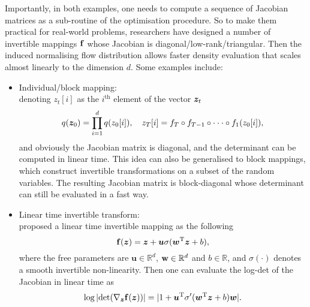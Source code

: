 Importantly, in both examples, one needs to compute a sequence of Jacobian matrices as a sub-routine of the optimisation procedure. So to make them practical for real-world problems, researchers have designed a number of invertible mappings $\mathbf{f}$ whose Jacobian is diagonal/low-rank/triangular. Then the induced normalising flow distribution allows faster density evaluation that scales almost linearly to the dimension $d$. Some examples include:

\begin{itemize}
\item Individual/block mapping: \\
denoting $z_{t}[i]$ as the $i^{\text{th}}$ element of the vector $\bm{z}_t$
$$q(\bm{z}_0) = \prod_{i=1}^d q(z_0[i]), \quad z_T[i] = f_{T} \circ f_{T-1} \circ \cdot \cdot \cdot \circ f_{1} (z_0[i]),$$
and obviously the Jacobian matrix is diagonal, and the determinant can be computed in linear time. This idea can also be generalised to block mappings, which construct invertible transformations on a subset of the random variables. The resulting Jacobian matrix is block-diagonal whose determinant can still be evaluated in a fast way.

\item Linear time invertible transform: \\
\cite{rezende:flow2015} proposed a linear time invertible mapping as the following
$$\mathbf{f}(\bm{z}) = \bm{z} + \bm{u} \sigma( \bm{w}^{\text{T}} \bm{z} + b), $$
where the free parameters are $\bm{u} \in \mathbb{R}^d$, $\bm{\mathbf{w}} \in \mathbb{R}^d$ and $b \in \mathbb{R}$, and $\sigma(\cdot)$ denotes a smooth invertible non-linearity. Then one can evaluate the log-det of the Jacobian in linear time as
$$\log |\text{det} ( \nabla_{\bm{z}} \mathbf{f}(\bm{z})) | = |1 + \bm{u}^{\text{T}} \sigma'(\bm{w}^{\text{T}} \bm{z} + b) \bm{w} | .$$


\end{itemize}
